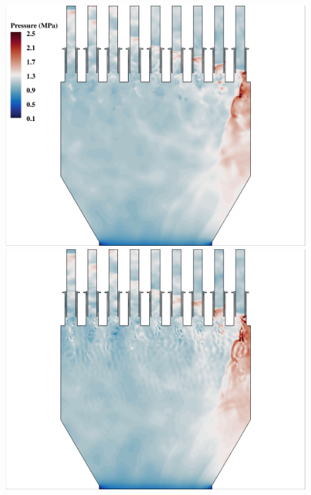 \begin{figure}
	{\begin{minipage}{0.32\linewidth}
		\includegraphics[width=0.99\linewidth,trim={0.5em 0.5em 15.0em 0.5em},clip]{Chapters/HPROMResults/Images/nineElem/deim/contours/fom_pressure_z.png}
	\end{minipage}
	\begin{minipage}{0.32\linewidth}
		\includegraphics[width=0.99\linewidth,trim={0.5em 0.5em 15.0em 0.5em},clip]{Chapters/HPROMResults/Images/nineElem/deim/contours/deim_0p001_pressure_z.png}
	\end{minipage}
	\begin{minipage}{0.32\linewidth}

\end{minipage}}
\end{figure}
